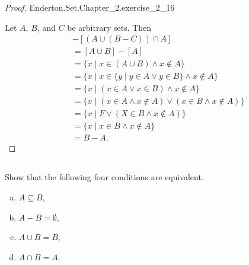 \documentclass{report}
\begin{document}
\begin{proof}

    {Enderton.Set.Chapter\_2.exercise\_2\_16}

  Let $A$, $B$, and $C$ be arbitrary sets.
  Then
    \begin{align*}
      [(A \cup B \cup C) \cap (A \cup B)] & - [(A \cup (B - C)) \cap A] \\
        & = [A \cup B] - [A] \\
        & = \{ x \mid x \in (A \cup B) \land x \not\in A \} \\
        & = \{ x \mid x \in \{ y \mid y \in A \lor y \in B \} \land x \not\in A \} \\
        & = \{ x \mid (x \in A \lor x \in B) \land x \not\in A \} \\\
        & = \{ x \mid (x \in A \land x \not\in A) \lor (x \in B \land x \not\in A) \} \\
        & = \{ x \mid F \lor (X \in B \land x \not\in A) \} \\
        & = \{ x \mid x \in B \land x \not\in A \} \\
        & = B - A.
    \end{align*}

\end{proof}

\subsection{}%
\label{sub:exercise-2.17}

Show that the following four conditions are equivalent.

\begin{enumerate}[(a)]
  \item $A \subseteq B$,
  \item $A - B = \emptyset$,
  \item $A \cup B = B$,
  \item $A \cap B = A$.
\end{enumerate}
\end{document}
